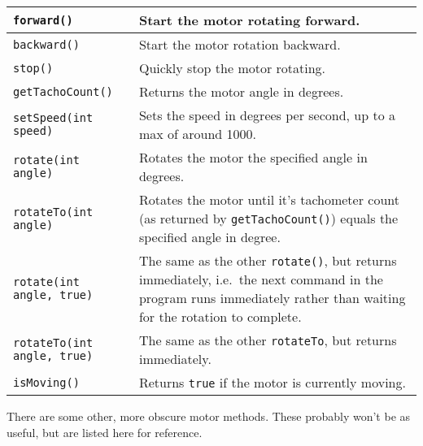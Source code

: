 \documentclass[11pt]{article}
\theoremstyle{plain}
\theoremstyle{definition}
\theoremstyle{remark}
\begin{document}
\begin{center}
  \begin{tabular}{|l|p{20em}|}
    \hline
    {\tt forward()} & Start the motor rotating forward. \\\hline
    {\tt backward()} & Start the motor rotation backward. \\\hline
    {\tt stop()} & Quickly stop the motor rotating. \\\hline
    {\tt getTachoCount()} & Returns the motor angle in degrees. \\\hline
    {\tt setSpeed(int speed)} & Sets the speed in degrees per second, up to a
    max of around 1000. \\\hline
    {\tt rotate(int angle)} & Rotates the motor the specified angle in degrees.
    \\\hline
    {\tt rotateTo(int angle)} & Rotates the motor until it's tachometer count
    (as returned by {\tt getTachoCount()}) equals the specified angle in degree.
    \\\hline
    {\tt rotate(int angle, true)} & The same as the other {\tt rotate()}, but
    returns immediately, i.e.\ the next command in the program runs immediately
    rather than waiting for the rotation to complete. \\\hline
    {\tt rotateTo(int angle, true)} & The same as the other {\tt rotateTo}, but
    returns immediately. \\\hline
    {\tt isMoving()} & Returns {\tt true} if the motor is currently moving.
    \\\hline
  \end{tabular}
\end{center}
There are some other, more obscure motor methods. These probably won't be as
useful, but are listed here for reference.
\end{document}
